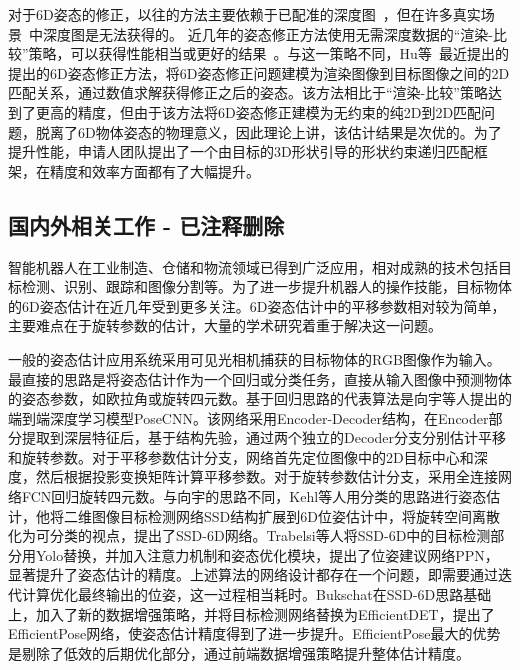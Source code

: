 \documentclass[12pt]{article}
\newcommand{\note}[1]{\textcolor[rgb]{0.6,0,0}{note: #1}}
\begin{document}
对于6D姿态的修正，以往的方法主要依赖于已配准的深度图~\cite{Xiang2018, li2019cdpn, wang2019densefusion60}，但在许多真实场景~\cite{Hu2021}中深度图是无法获得的。
近几年的姿态修正方法使用无需深度数据的“渲染-比较”策略，可以获得性能相当或更好的结果~\cite{li2018deepim, zakharov2019dpod, cosypose, rad2017bb8, Hu2022, Lipson2022, RNNPose_2022_cvpr,Repose_2021_iccv}。与这一策略不同，Hu等~\cite{Hu2022}最近提出的提出的6D姿态修正方法，将6D姿态修正问题建模为渲染图像到目标图像之间的2D匹配关系，通过数值求解获得修正之后的姿态。该方法相比于“渲染-比较”策略达到了更高的精度，但由于该方法将6D姿态修正建模为无约束的纯2D到2D匹配问题，脱离了6D物体姿态的物理意义，因此理论上讲，该估计结果是次优的。为了提升性能，申请人团队提出了一个由目标的3D形状引导的形状约束递归匹配框架，在精度和效率方面都有了大幅提升。


\iffalse
\subsection{国内外相关工作 - 已注释删除}


智能机器人在工业制造、仓储和物流领域已得到广泛应用，相对成熟的技术包括目标检测、识别、跟踪和图像分割等。为了进一步提升机器人的操作技能，目标物体的6D姿态估计在近几年受到更多关注。6D姿态估计中的平移参数相对较为简单，主要难点在于旋转参数的估计，大量的学术研究着重于解决这一问题。

一般的姿态估计应用系统采用可见光相机捕获的目标物体的RGB图像作为输入。最直接的思路是将姿态估计作为一个回归或分类任务，直接从输入图像中预测物体的姿态参数，如欧拉角或旋转四元数。基于回归思路的代表算法是向宇等人提出的端到端深度学习模型PoseCNN\cite{Xiang2018}。该网络采用Encoder-Decoder结构，在Encoder部分提取到深层特征后，基于结构先验，通过两个独立的Decoder分支分别估计平移和旋转参数。对于平移参数估计分支，网络首先定位图像中的2D目标中心和深度，然后根据投影变换矩阵计算平移参数。对于旋转参数估计分支，采用全连接网络FCN回归旋转四元数。与向宇的思路不同，Kehl等人用分类的思路进行姿态估计，他将二维图像目标检测网络SSD\cite{liu2016ssd}结构扩展到6D位姿估计中，将旋转空间离散化为可分类的视点，提出了SSD-6D\cite{kehl2017ssd}网络。Trabelsi等人将SSD-6D中的目标检测部分用Yolo替换，并加入注意力机制和姿态优化模块，提出了位姿建议网络PPN\cite{trabelsi2021pose}，显著提升了姿态估计的精度。上述算法的网络设计都存在一个问题，即需要通过迭代计算优化最终输出的位姿，这一过程相当耗时。Bukschat在SSD-6D思路基础上，加入了新的数据增强策略，并将目标检测网络替换为EfficientDET\cite{tan2020efficientdet}，提出了EfficientPose\cite{bukschat2020efficientpose}网络，使姿态估计精度得到了进一步提升。EfficientPose最大的优势是剔除了低效的后期优化部分，通过前端数据增强策略提升整体估计精度。
\end{document}
